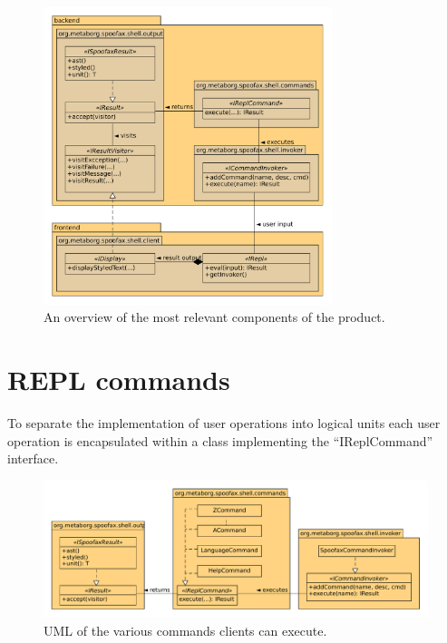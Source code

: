 \begin{figure}[h!]
  \centering
  \includegraphics[width=0.75\textwidth]{uml-overview}
  \caption{An overview of the most relevant components of the product.}
  \label{fig:uml-overview}
\end{figure}

\section{REPL commands}
\label{sec:commands}

To separate the implementation of user operations into logical units each user
operation is encapsulated within a class implementing the ``IReplCommand''
interface.

\begin{figure}[h]
  \centering
  \includegraphics[width=\textwidth]{uml-commands}
  \caption{UML of the various commands clients can execute.}
  \label{fig:uml-commands}
\end{figure}

\section{}
\label{sec:function-comp}

